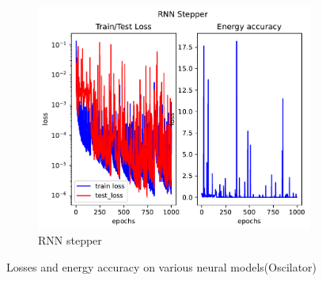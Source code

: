 \begin{figure}[H]
\begin{subfigure}[b]{0.3\textwidth}
		\includegraphics[width=\textwidth]{chapters/chapter5/osci_rne_loss.pdf}
		\caption{RNN stepper}
	\end{subfigure}
	\label{osci_loss}
	\caption{Losses and energy accuracy on various neural models(Oscilator)}
\end{figure}


